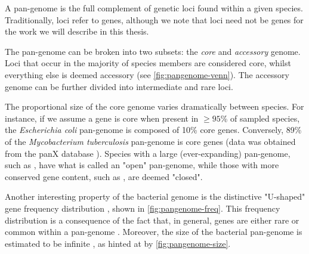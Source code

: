 A pan-genome is the full complement of genetic loci found within a given species. Traditionally, loci refer to genes, although we note that loci need not be genes for the work we will describe in this thesis.

The pan-genome can be broken into two subsets: the \emph{core} and \emph{accessory} genome. Loci that occur in the majority of species members are considered core, whilst everything else is deemed accessory (see \autoref{fig:pangenome-venn}). The accessory genome can be further divided into intermediate and rare loci. 

The proportional size of the core genome varies dramatically between species. For instance, if we assume a gene is core when present in $\ge 95$\% of sampled species, the \textit{Escherichia coli} pan-genome is composed of 10\% core genes. Conversely, 89\% of the \textit{Mycobacterium tuberculosis} pan-genome is core genes (data was obtained from the panX database \cite{panx}). Species with a large (ever-expanding) pan-genome, such as \ecoli{}, have what is called an "open" pan-genome, while those with more conserved gene content, such as \mtb{}, are deemed "closed". 

Another interesting property of the bacterial genome is the distinctive "U-shaped" gene frequency distribution \cite{Lobkovsky2013,pandora,Lapierre2009}, shown in \autoref{fig:pangenome-freq}. This frequency distribution is a consequence of the fact that, in general, genes are either rare or common within a pan-genome \cite{Lobkovsky2013,thepangenome2020}. Moreover, the size of the bacterial pan-genome is estimated to be infinite \cite{Lapierre2009}, as hinted at by \autoref{fig:pangenome-size}.

